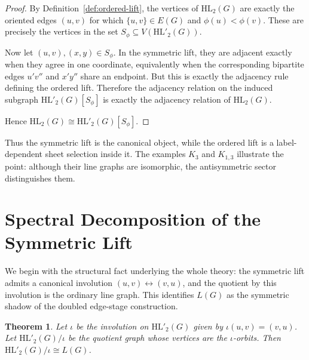 \documentclass[11pt]{article}
\newtheorem{theorem}{Theorem}
\newcommand{\HL}{\mathrm{HL}}
\theoremstyle{plain}
\begin{document}
\begin{proof}
By Definition~\ref{def:ordered-lift}, the vertices of $\HL_2(G)$ are exactly the oriented edges
$(u,v)$ for which $\{u,v\}\in E(G)$ and $\phi(u)<\phi(v)$. These are precisely the vertices in
the set \(S_\phi\subseteq V(\HL'_2(G))\).

Now let $(u,v),(x,y)\in S_\phi$. In the symmetric lift, they are adjacent exactly when they agree
in one coordinate, equivalently when the corresponding bipartite edges $u'v''$ and $x'y''$ share
an endpoint. But this is exactly the adjacency rule defining the ordered lift. Therefore the
adjacency relation on the induced subgraph $\HL'_2(G)[S_\phi]$ is exactly the adjacency relation
of $\HL_2(G)$.

Hence $\HL_2(G)\cong \HL'_2(G)[S_\phi]$.
\end{proof}

Thus the symmetric lift is the canonical object, while the ordered lift is a label-dependent sheet selection
inside it. The examples \(K_3\) and \(K_{1,3}\) illustrate the point: although their line graphs are
isomorphic, the antisymmetric sector distinguishes them.

\section{Spectral Decomposition of the Symmetric Lift}


We begin with the structural fact underlying the whole theory: the symmetric lift admits a canonical involution
\((u,v)\leftrightarrow (v,u)\), and the quotient by this involution is the ordinary line graph.
This identifies \(L(G)\) as the symmetric shadow of the doubled edge-stage construction.

\begin{theorem}\label{thm:quotient-is-linegraph}
Let $\iota$ be the involution on $\HL'_2(G)$ given by $\iota(u,v)=(v,u)$.
Let $\HL'_2(G)/\iota$ be the quotient graph whose vertices are the $\iota$-orbits.
Then $\HL'_2(G)/\iota \cong L(G)$.
\end{theorem}
\end{document}

